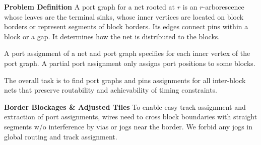 \documentclass[a2paper]{bigsposter}
\begin{document}
\begin{blockrow}[3]
\textbf{Problem Definition}
A port graph for a net rooted at $r$ is an $r$-arborescence whose
leaves are the terminal sinks, whose inner vertices are located on block
borders or represent segments of block borders. Its edges connect pins 
within a block or a gap.
It determines how the net is distributed to the blocks.

A port assignment of a net and port graph specifies for each inner vertex of the port graph. A partial port assignment only assigns port positions to some blocks. %

%
The overall task is to find port graphs and pins assignments for all
inter-block nets that preserve routability and achievability of
timing constraints.


\begin{comment}
	

  \blocktitle{Previous work}
  Early port assignment algorithms were based on concentric circuits \cite{koren1972pin}
  and topological models \cite{brady1984approach}.
  Later, port assignment was combined with global routing
  \cite{cong1991pin, wang1991simultaneous, KoideWY-PinAssignmentWithGLobalRouting96, Chen+IntegratedFloorplanningAndInterconnectPlanning:1999},
  considering congestion (essentially) on the block borders using a so-called channel connection graph, and deriving
  port positions from global routing. Among these works,  \cite{wang1991simultaneous}  allows the creation of feedthrough routes.
  An integration of port assignment  with floorplanning for two-port nets is considered in  \cite{pedram1990floorplanning}.
  
  Minimum-cost flow algorithms for laying out all 2-port nets from one
  block to all others simultaneously were used \cite{xiang2003min}, also
  including buffer planning \cite{xiang2005algorithm}.
  
  According to \cite{Scheffer-IndustrialFloorplanningAndPrototyping08}, most of the above techniques are not applied in industrial floorplanning tools.
  Instead,  a rough timing-aware routing is done on a flattened netlist and pins are assigned
  where the boundaries are crossed \cite{Scheffer-IndustrialFloorplanningAndPrototyping08}.
  Boundary assertions are mostly created based on the zero slack algorithm
  \cite{nair+berman+hauge+yoffa:1989,Scheffer-IndustrialFloorplanningAndPrototyping08}.
  \blockbreak
\end{comment}
\blockbreak
 
  \textbf{Border Blockages \& Adjusted Tiles}
  \label{sec:tiles_n_border_blockages}
  To enable easy track assignment and extraction of port assignments,  wires
  need to  cross block boundaries with straight segments  w/o interference by vias or jogs near the border.
  We forbid any jogs in global routing and track assignment.
  

\end{blockrow}
\end{document}
